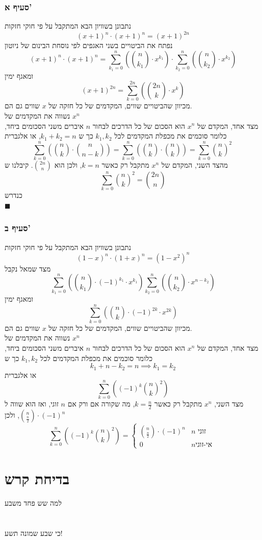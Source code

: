 \documentclass[12pt, titlepage]{article}
\begin{document}
\section*{סעיף א'}
נתבונן בשוויון הבא המתקבל על פי חוקי חזקות
\[
    \left(x+1\right)^n \cdot \left(x+1\right)^n = \left(x+1\right)^{2n}
\]
נפתח את הביטויים בשני האגפים לפי נוסחת הבינום של ניוטון
\[
    \left(x+1\right)^n \cdot \left(x+1\right)^n = \sum_{k_1=0}^{n} \left(\binom{n}{k_1} \cdot x^{k_1}\right) \cdot \sum_{k_2=0}^{n}\left( \binom{n}{k_2} \cdot x^{k_2}\right)
\]
ומאגף ימין
\[
    \left(x+1\right)^{2n} = \sum_{k=0}^{2n} \left(\binom{2n}{k} \cdot x^{k}\right)
\]
מכיוון שהביטויים שווים, המקדמים של כל חזקה של $x$ שווים גם הם.\\
נשווה את המקדמים של $x^n$\\
מצד אחד, המקדם של $x^n$ הוא הסכום של כל הדרכים לבחור $n$ איברים משני הסכומים ביחד, כלומר סוכמים את מכפלת המקדמים לכל $k_1,k_2$ כך ש $k_1+k_2=n$, או אלגברית
\[
    \sum_{k=0}^{n} \left(\binom{n}{k}\cdot\binom{n}{n-k} \right) = \sum_{k=0}^{n}\left(\binom{n}{k}\cdot\binom{n}{k} \right) = \sum_{k=0}^{n} \binom{n}{k}^2\
\]
מהצד השני, המקדם של $x^n$ מתקבל רק כאשר $k=n$, ולכן הוא $\binom{2n}{n}$.
קיבלנו ש
\[
   \sum_{k=0}^{n} \binom{n}{k}^2 =   \binom{2n}{n}
\]
כנדרש\\
$\blacksquare$
\section*{סעיף ב'}
נתבונן בשוויון הבא המתקבל על פי חוקי חזקות
\[
    \left(1-x\right)^n \cdot \left(1+x\right)^n = \left(1-x^2\right)^n
\]
מצד שמאל נקבל
\[
    \sum_{k_1=0}^n \left(\binom{n}{k_1} \cdot \left(-1\right)^{k_1}\cdot x^{k_1}\right) \sum_{k_2=0}^n \left(\binom{n}{k_2}\cdot x^{n-k_2}\right)
\]
ומאגף ימין
\[
    \sum_{k=0}^{n} \left(\binom{n}{k} \cdot \left(-1\right)^{2k} \cdot x^{2k}\right)
\]
מכיוון שהביטויים שווים, המקדמים של כל חזקה של $x$ שווים גם הם.\\
נשווה את המקדמים של $x^n$\\
מצד אחד, המקדם של $x^n$ הוא הסכום של כל הדרכים לבחור $n$ איברים משני הסכומים ביחד, כלומר סוכמים את מכפלת המקדמים לכל $k_1,k_2$ כך ש
\[
    k_1+n-k_2=n\implies k_1=k_2
\]
או אלגברית
\[
    \sum_{k=0}^{n} \left(\left(-1\right)^{k} \binom{n}{k}^2 \right)
\]
מצד השני, $x^n$ מתקבל רק כאשר $k= \frac{n}{2}$, מה שקורה אם ורק אם $n$ זוגי, ואז הוא שווה ל$\binom{n}{\frac{n}{2}}\cdot\left(-1\right)^n$, ולכן
\[
\boxed{\sum_{k=0}^{n} \left(\left(-1\right)^{k} \binom{n}{k}^2 \right) = \begin{cases}
        \binom{n}{\frac{n}{2}} \cdot \left(-1\right)^n & n\text{ זוגי}\\
        0 & n \text{אי-זוגי }
\end{cases}}
\]
\newpage
\part*{בדיחת קרש}
למה שש פחד משבע\\\\\\
כי שבע שמונה תשע!
\end{document}

